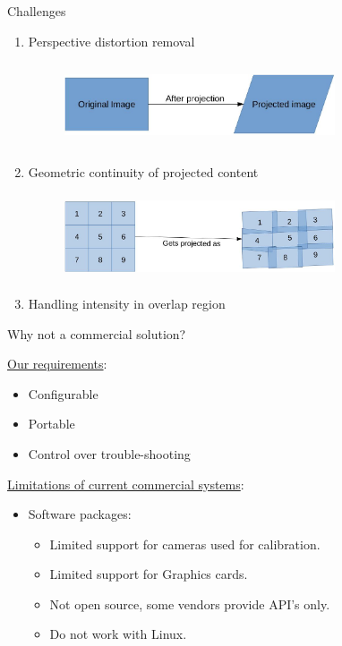 \documentclass{beamer}
\begin{document}
\begin{frame}{Challenges}
\begin{enumerate}
\item Perspective distortion removal
\begin{figure}
\includegraphics[width=8cm,height=2.5cm]{figures/distortion_prob.jpg}
\end{figure} 
\item Geometric continuity of projected content
\begin{figure}
\includegraphics[width=8cm, height=2.5cm]{figures/continuity_prob.jpg}
\end{figure}
\item Handling intensity in overlap region
\end{enumerate}
\end{frame}


\begin{frame}{Why not a commercial solution?}

\underline{Our requirements}:
\begin{itemize}
\item Configurable
\item Portable
\item Control over trouble-shooting
\end{itemize}

\underline{Limitations of current commercial systems}:
\begin{itemize}
\item Software packages:
\begin{itemize}
\item Limited support for cameras used for calibration.
\item Limited support for Graphics cards. 
\item Not open source, some vendors provide API's only.
\item Do not work with Linux.
\end{itemize}
\end{itemize}
\end{frame}
\end{document}
